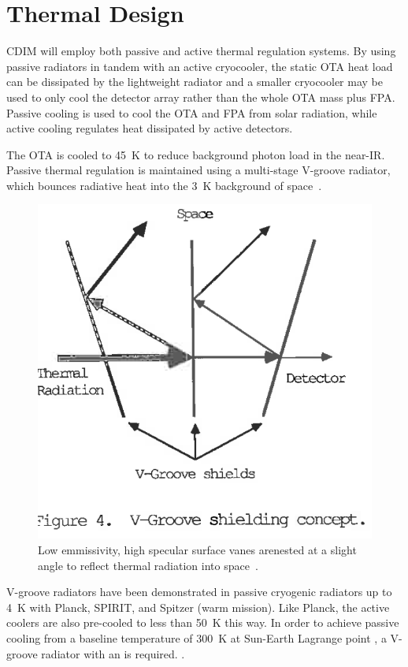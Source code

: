 \documentclass{ws-jai}
\begin{document}
\section{Thermal Design}
\label{sec:thermal}
CDIM will employ both passive and active thermal regulation systems.
By using passive radiators in tandem with an active cryocooler, the static OTA heat load can be dissipated by the lightweight radiator and a smaller cryocooler may be used to only cool the detector array rather than the whole OTA mass plus FPA.\@
Passive cooling is used to cool the OTA and FPA from solar radiation, while active cooling regulates heat dissipated by active detectors.

The OTA is cooled to \SI{45}{\kelvin} to reduce background photon load in the near-IR.\@
Passive thermal regulation is maintained using a multi-stage V-groove radiator, which bounces radiative heat into the \SI{3}{\kelvin} background of space~\cite{bard_1987}.

\begin{figure}[!hb]
  \centering
  \includegraphics[width=.5\linewidth]{figs/vgroove-concept.png}
  \caption{Low emmissivity, high specular surface vanes arenested at a slight angle to reflect thermal radiation into space~\cite{rasbach1988}. }
\label{fig:v-groove}
\end{figure}

V-groove radiators have been demonstrated in passive cryogenic radiators up to \SI{4}{\kelvin} with Planck, SPIRIT, and Spitzer (warm mission).\@
Like Planck, the active coolers are also pre-cooled to less than \SI{50}{\kelvin} this way. 
In order to achieve passive cooling from a baseline temperature of \SI{300}{\kelvin} at Sun-Earth Lagrange point \Ltwo, a  V-groove radiator with an  is required.
.
\end{document}
